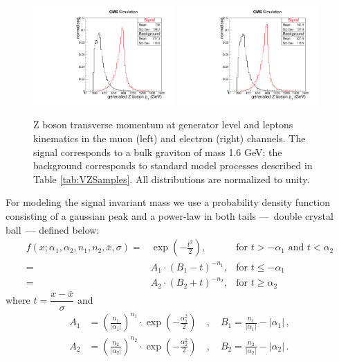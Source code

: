 \begin{figure}[p]
\includegraphics[width=0.48\textwidth]{figures/objects/genZptMNP.pdf}
\includegraphics[width=0.48\textwidth]{figures/objects/genZptENP.pdf}
\caption[Signal characterization]{Z boson transverse momentum at generator level and leptons kinematics in the muon (left) and electron (right) channels. The signal corresponds to a bulk graviton of mass 1.6 GeV; the background corresponds to standard model processes described in Table \ref{tab:VZSamples}. All distributions are normalized to unity.}
\label{fig:signalid}
\end{figure}

For modeling the signal invariant mass we use a probability density function consisting of a gaussian peak and a power-law in both tails ---~double crystal ball~--- defined below:
\begin{eqnarray*}
f(x;\alpha_1,\alpha_2,n_1,n_2,\bar x,\sigma) =& \exp(- \frac{t^2}{2}), & \mbox{for } t > -\alpha_1 \mbox{  and  } t<\alpha_2 \\
=& A_1 \cdot (B_1 - t)^{-n_1}, & \mbox{for } t \leq -\alpha_1 \\
=& A_2 \cdot (B_2 + t)^{-n_2}, & \mbox{for } t \geq \alpha_2
\end{eqnarray*}
where $t = \dfrac{x - \bar x}{\sigma}$ and
\begin{eqnarray*}
A_1 &= \left(\frac{n_1}{\left| \alpha_1 \right|}\right)^{n_1} \cdot \exp\left(- \frac {\alpha_1 ^2}{2}\right) \quad , \quad
B_1 = \frac{n_1}{\left| \alpha_1 \right|}  - \left| \alpha_1 \right|\,,\\
A_2 &= \left(\frac{n_2}{\left| \alpha_2 \right|}\right)^{n_2} \cdot \exp\left(- \frac {\alpha_2 ^2}{2}\right) \quad , \quad
B_2 = \frac{n_2}{\left| \alpha_2 \right|}  - \left| \alpha_2 \right|\,.
\end{eqnarray*}

